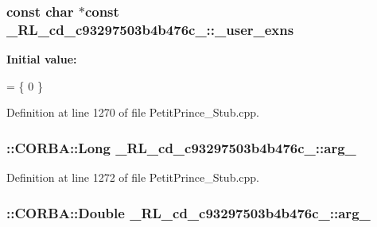 \subsubsection[{\texorpdfstring{\+\_\+user\+\_\+exns}{_user_exns}}]{\setlength{\rightskip}{0pt plus 5cm}const char $\ast$const \+\_\+R\+L\+\_\+cd\+\_\+c93297503b4b476c\+\_\+::\+\_\+user\+\_\+exns\hspace{0.3cm}{\ttfamily [static]}}\hypertarget{class__0_r_l__cd__c93297503b4b476c__50000000_ab515d885d1083c80fcaf70a6878e41e6}{}\label{class__0_r_l__cd__c93297503b4b476c__50000000_ab515d885d1083c80fcaf70a6878e41e6}
{\bfseries Initial value\+:}
\begin{DoxyCode}
= \{
  0
\}
\end{DoxyCode}


Definition at line 1270 of file Petit\+Prince\+\_\+\+Stub.\+cpp.

\subsubsection[{\texorpdfstring{arg\+\_\+0}{arg_0}}]{\setlength{\rightskip}{0pt plus 5cm}\+::C\+O\+R\+B\+A\+::\+Long \+\_\+R\+L\+\_\+cd\+\_\+c93297503b4b476c\+\_\+::arg\+\_}\hypertarget{class__0_r_l__cd__c93297503b4b476c__50000000_adf874b79561a94362612a9a66efe8367}{}\label{class__0_r_l__cd__c93297503b4b476c__50000000_adf874b79561a94362612a9a66efe8367}


Definition at line 1272 of file Petit\+Prince\+\_\+\+Stub.\+cpp.

\subsubsection[{\texorpdfstring{arg\+\_\+1}{arg_1}}]{\setlength{\rightskip}{0pt plus 5cm}\+::C\+O\+R\+B\+A\+::\+Double \+\_\+R\+L\+\_\+cd\+\_\+c93297503b4b476c\+\_\+::arg\+\_}\hypertarget{class__0_r_l__cd__c93297503b4b476c__50000000_a47d6cd5ebcdbf217e29a25baba671df8}{}\label{class__0_r_l__cd__c93297503b4b476c__50000000_a47d6cd5ebcdbf217e29a25baba671df8}


